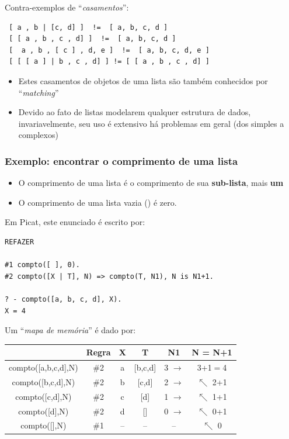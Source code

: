 \begin{frame}[fragile, allowframebreaks=0.9]
\begin{block}{Contra-exemplos de ``{\em casamentos}'':}
\begin{verbatim}
 [ a , b | [c, d] ]  !=  [ a, b, c, d ]
 [ [ a , b , c , d] ]  !=  [ a, b, c, d ]
 [  a , b , [ c ] , d, e ]  !=  [ a, b, c, d, e ]
 [ [ [ a ] | b , c , d] ] != [ [ a , b , c , d] ]
 \end{verbatim}

\end{block}

\framebreak
\begin{itemize}
  \item Estes  casamentos de objetos de uma lista
  são também conhecidos  por ``{\em matching}'' 

\item  Devido ao fato de listas modelarem
qualquer estrutura de dados, invariavelmente, seu uso  é extensivo
há  problemas em geral (dos simples a complexos)

\end{itemize}


\end{frame}



\begin{frame}[fragile, allowframebreaks=0.9]
\frametitle{Exemplo: encontrar o comprimento de uma lista}
 
\begin{itemize}
   \item O comprimento de uma lista é o comprimento de sua \textbf{sub-lista}, mais \textbf{um}
   \item O comprimento de uma lista vazia (\lbrack  \rbrack) é zero.
 \end{itemize} 
 
Em Picat, este enunciado é escrito por:

\begin{verbatim}
REFAZER

#1 compto([ ], 0).
#2 compto([X | T], N) => compto(T, N1), N is N1+1.

? - compto([a, b, c, d], X).
X = 4
\end{verbatim}


\framebreak
Um ``{\em mapa de memória}'' é dado por:

\begin{center}
\begin{tabular}[c]{|c|c|c|c|c|c|}
\hline
& Regra & X & T & N1 & N = N+1\\\hline
compto([a,b,c,d],N) & \#2 & a & [b,c,d] & 3 $\rightarrow$ & 3+1$=$4\\\hline
compto([b,c,d],N) & \#2 & b & [c,d] & 2 $\rightarrow$ & $\nwarrow$ 2+1\\\hline
compto([c,d],N) & \#2 & c & [d] & 1 $\rightarrow$ & $\nwarrow$ 1+1\\\hline
compto([d],N) & \#2 & d & [] & 0 $\rightarrow$ & $\nwarrow$ 0+1\\\hline
compto([],N) & \#1 & -- & -- & -- & $\nwarrow$ 0\\\hline
\end{tabular}
\end{center}
 

\end{frame}


